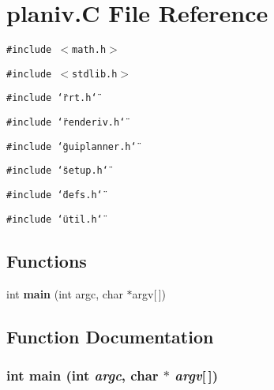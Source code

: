 \section{planiv.C File Reference}
\label{planiv_C}
{\tt \#include $<$math.h$>$}\par
{\tt \#include $<$stdlib.h$>$}\par
{\tt \#include \char`\"{}rrt.h\char`\"{}}\par
{\tt \#include \char`\"{}renderiv.h\char`\"{}}\par
{\tt \#include \char`\"{}guiplanner.h\char`\"{}}\par
{\tt \#include \char`\"{}setup.h\char`\"{}}\par
{\tt \#include \char`\"{}defs.h\char`\"{}}\par
{\tt \#include \char`\"{}util.h\char`\"{}}\par
\subsection*{Functions}
\begin{CompactItemize}
\item 
int {\bf main} (int argc, char $\ast$argv[$\,$])
\end{CompactItemize}


\subsection{Function Documentation}
\subsubsection{\setlength{\rightskip}{0pt plus 5cm}int main (int {\em argc}, char $\ast$ {\em argv}[$\,$])}\label{planiv_C_a0}


